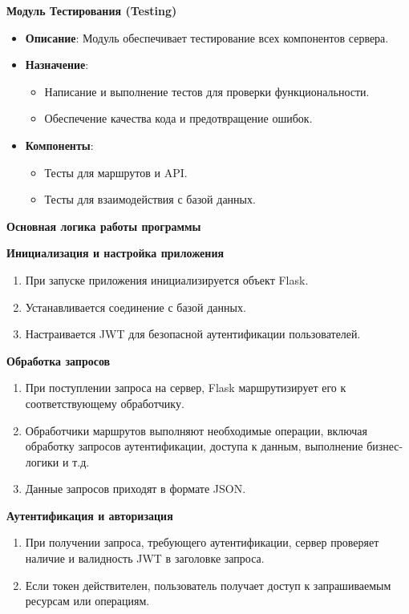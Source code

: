 \documentclass[12pt, russian]{extarticle}
\begin{document}
\begin{spacing}{1.5}
\par \noindent \textbf{Модуль Тестирования (Testing)}
\begin{itemize}
    \item \textbf{Описание}: Модуль обеспечивает тестирование всех компонентов сервера.
    \item \textbf{Назначение}:
    \begin{itemize}
        \item Написание и выполнение тестов для проверки функциональности.
        \item Обеспечение качества кода и предотвращение ошибок.
    \end{itemize}
    \item \textbf{Компоненты}:
    \begin{itemize}
        \item Тесты для маршрутов и API.
        \item Тесты для взаимодействия с базой данных.
    \end{itemize}
\end{itemize}

\par \noindent \textbf{Основная логика работы программы}

\par \noindent \textbf{Инициализация и настройка приложения}
\begin{enumerate}
    \item При запуске приложения инициализируется объект Flask.
    \item Устанавливается соединение с базой данных.
    \item Настраивается JWT для безопасной аутентификации пользователей.
\end{enumerate}

\par \noindent \textbf{Обработка запросов}
\begin{enumerate}
    \item При поступлении запроса на сервер, Flask маршрутизирует его к соответствующему обработчику.
    \item Обработчики маршрутов выполняют необходимые операции, включая обработку запросов аутентификации, доступа к данным, выполнение бизнес-логики и т.д.
    \item Данные запросов приходят в формате JSON.
\end{enumerate}

\par \noindent \textbf{Аутентификация и авторизация}
\begin{enumerate}
    \item При получении запроса, требующего аутентификации, сервер проверяет наличие и валидность JWT в заголовке запроса.
    \item Если токен действителен, пользователь получает доступ к запрашиваемым ресурсам или операциям.
\end{enumerate}


\end{spacing}
\end{document}
